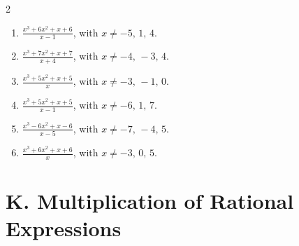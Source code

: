 \documentclass[11pt,oneside]{book}
\begin{document}
\begin{multicols}{2}
\begin{enumerate}[leftmargin=*,label=\textbf{J\arabic*.},itemsep=0.45\baselineskip]
\item $\displaystyle \frac{x^{3} + 6 x^{2} + x + 6}{x - 1}$, with $x\ne -5,\,1,\,4$.
\item $\displaystyle \frac{x^{3} + 7 x^{2} + x + 7}{x + 4}$, with $x\ne -4,\,-3,\,4$.
\item $\displaystyle \frac{x^{3} + 5 x^{2} + x + 5}{x}$, with $x\ne -3,\,-1,\,0$.
\item $\displaystyle \frac{x^{3} + 5 x^{2} + x + 5}{x - 1}$, with $x\ne -6,\,1,\,7$.
\item $\displaystyle \frac{x^{3} - 6 x^{2} + x - 6}{x - 5}$, with $x\ne -7,\,-4,\,5$.
\item $\displaystyle \frac{x^{3} + 6 x^{2} + x + 6}{x}$, with $x\ne -3,\,0,\,5$.
\end{enumerate}
\end{multicols}
\section*{K. Multiplication of Rational Expressions}
\end{document}
